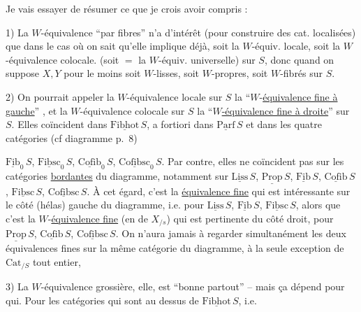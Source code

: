 Je vais essayer de résumer ce que je crois avoir compris :

1) La $W$-équivalence ``par fibres'' n'a d'intérêt  (pour construire des cat. localisées) que dans le cas où on sait qu'elle implique déjà, soit la $W$-équiv. locale, soit la $W$-équivalence colocale. (soit $=$ la $W$-équiv. universelle) sur $S$, donc quand on suppose $X,Y$ pour le moins  soit $W$-lisses, soit $W$-propres, soit $W$-fibrés sur $S$.

2) On pourrait appeler la $W$-équivalence locale sur $S$ la ``$W$-\uline{équivalence fine à gauche}'' , et la $W$-équivalence colocale sur $S$ la ``\uline{$W$-équivalence fine à droite}'' sur $S$. Elles coïncident dans $\underline{\mathrm{Fibhot}}\,S$, a fortiori dans $\underline{\mathrm{Parf}}\,S$  et dans les quatre catégories (cf diagramme p.~8)


$\underline{\mathrm{Fib}}_0\,S$, $\underline{\mathrm{Fibsc}}_0\,S$, $\underline{\mathrm{Cofib}}_0\,S$, $\underline{\mathrm{Cofibsc}}_0\,S$. Par contre, elles ne coïncident pas sur les catégories \uline{bordantes} du diagramme, notamment sur $\underline{\mathrm{Liss}}\,S$, $\underline{\mathrm{Prop}}\,S$, $\underline{\mathrm{Fib}}\,S$, $\underline{\mathrm{Cofib}}\,S$, $\underline{\mathrm{Fibsc}}\,S$, $\underline{\mathrm{Cofibsc}}\,S$. À cet égard, c'est la \uline{équivalence fine}   qui est intéressante sur le côté (hélas) gauche du diagramme, i.e. pour $\underline{\mathrm{Liss}}\,S$, $\underline{\mathrm{Fib}}\,S$, $\underline{\mathrm{Fibsc}}\,S$, alors que c'est la $W$-\uline{équivalence fine}  (en  de $X_{/s}$) qui est pertinente du côté droit, pour $\underline{\mathrm{Prop}}\,S$, $\underline{\mathrm{Cofib}}\,S$, $\underline{\mathrm{Cofibsc}}\,S$. On n'aura jamais à  regarder simultanément les deux équivalences fines sur la  même catégorie du diagramme, à la seule exception de $\mathrm{Cat}_{/S}$ tout entier,

3) La $W$-équivalence grossière, elle, est ``bonne partout'' -- mais ça dépend pour qui. Pour les  catégories qui sont  au dessus de $\underline{\mathrm{Fibhot}}\,S$, i.e.

